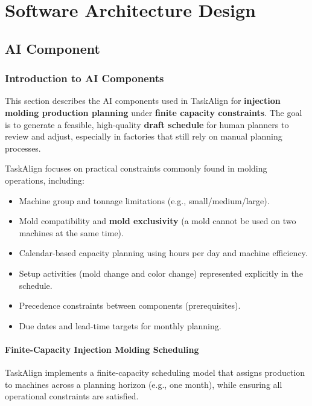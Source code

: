 \chapter{Software Architecture Design}
\label{chap:software-architecture-design}

\section{AI Component}
\label{section:ai-component}

\subsection{Introduction to AI Components}
This section describes the AI components used in TaskAlign for \textbf{injection molding production planning} under \textbf{finite capacity constraints}. The goal is to generate a feasible, high-quality \textbf{draft schedule} for human planners to review and adjust, especially in factories that still rely on manual planning processes.

TaskAlign focuses on practical constraints commonly found in molding operations, including:
\begin{itemize}
    \item Machine group and tonnage limitations (e.g., small/medium/large).
    \item Mold compatibility and \textbf{mold exclusivity} (a mold cannot be used on two machines at the same time).
    \item Calendar-based capacity planning using hours per day and machine efficiency.
    \item Setup activities (mold change and color change) represented explicitly in the schedule.
    \item Precedence constraints between components (prerequisites).
    \item Due dates and lead-time targets for monthly planning.
\end{itemize}

\subsubsection*{Finite-Capacity Injection Molding Scheduling}
TaskAlign implements a finite-capacity scheduling model that assigns production to machines across a planning horizon (e.g., one month), while ensuring all operational constraints are satisfied.

